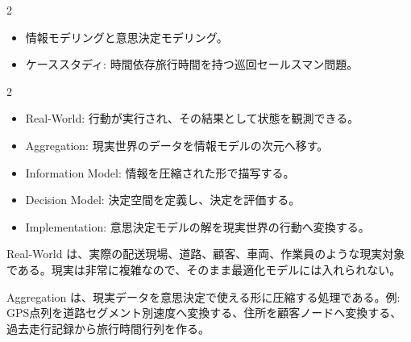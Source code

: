\clearpage
{}
\begin{multicols}{2}\scriptsize\raggedcolumns
{}
\begin{itemize}
\item 情報モデリングと意思決定モデリング。
\item ケーススタディ: 時間依存旅行時間を持つ巡回セールスマン問題。
\end{itemize}
\end{multicols}

\clearpage
{}
\begin{multicols}{2}\footnotesize\raggedcolumns
{}
\begin{itemize}
\item Real-World: 行動が実行され、その結果として状態を観測できる。
\item Aggregation: 現実世界のデータを情報モデルの次元へ移す。
\item Information Model: 情報を圧縮された形で描写する。
\item Decision Model: 決定空間を定義し、決定を評価する。
\item Implementation: 意思決定モデルの解を現実世界の行動へ変換する。
\end{itemize}
Real-World は、実際の配送現場、道路、顧客、車両、作業員のような現実対象である。現実は非常に複雑なので、そのまま最適化モデルには入れられない。\par

Aggregation は、現実データを意思決定で使える形に圧縮する処理である。例: GPS点列を道路セグメント別速度へ変換する、住所を顧客ノードへ変換する、過去走行記録から旅行時間行列を作る。\par


\end{multicols}
